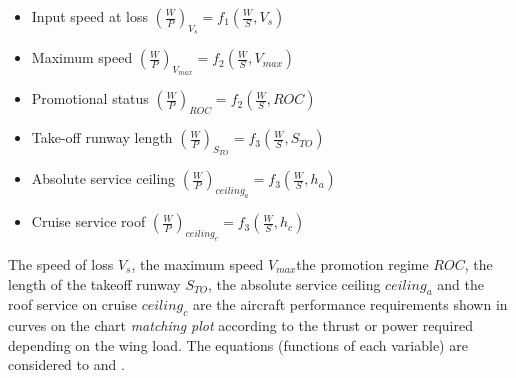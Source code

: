 \begin{itemize}
    \item Input speed at loss $ (\frac{W}{P} )_{V_s} = f_1 (\frac{W}{S}, V_s)$
    \item Maximum speed $ (\frac{W}{P} )_{V_{max}} = f_2 (\frac{W}{S}, V_{max})$
    \item Promotional status  $ (\frac{W}{P} )_{ROC} = f_2 (\frac{W}{S}, ROC)$
    \item Take-off runway length $ (\frac{W}{P} )_{S_{TO}} = f_3 (\frac{W}{S}, S_{TO})$
    \item Absolute service ceiling $ (\frac{W}{P} )_{ceiling_{a}} = f_3 (\frac{W}{S}, h_a)$
    \item Cruise service roof $ (\frac{W}{P} )_{ceiling_{c}} = f_3 (\frac{W}{S}, h_c)$
\end{itemize}

The speed of loss $V_s$, the maximum speed $V_{max}$the promotion regime $ROC$, the length of the takeoff runway $S_{TO}$, the absolute service ceiling $ceiling_a$ and the roof service on cruise $ceiling_c$ are the aircraft performance requirements shown in curves on the chart \textit{matching plot} according to the thrust or power required depending on the wing load. 
%
The equations (functions of each variable) are considered to \cite{Mohammad2020} and \cite{Sadraey2013}. 

